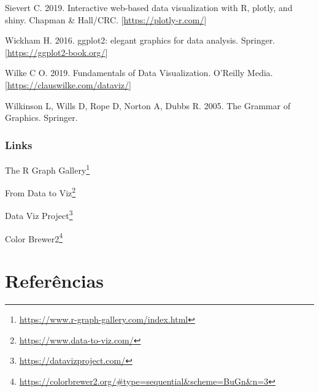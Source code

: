 \documentclass[
]{book}
\renewcommand{\href}[2]{#2\footnote{\url{#1}}}
\begin{document}
Sievert C. 2019. Interactive web-based data visualization with R, plotly, and shiny. Chapman \& Hall/CRC. {[}\url{https://plotly-r.com/}{]}

Wickham H. 2016. ggplot2: elegant graphics for data analysis. Springer. {[}\url{https://ggplot2-book.org/}{]}

Wilke C O. 2019. Fundamentals of Data Visualization. O'Reilly Media. {[}\url{https://clauswilke.com/dataviz/}{]}

Wilkinson L, Wills D, Rope D, Norton A, Dubbs R. 2005. The Grammar of Graphics. Springer.

\hypertarget{links-1}{%
\subsection{Links}\label{links-1}}

\href{https://www.r-graph-gallery.com/index.html}{The R Graph Gallery}

\href{https://www.data-to-viz.com/}{From Data to Viz}

\href{https://datavizproject.com/}{Data Viz Project}

\href{https://colorbrewer2.org/\#type=sequential\&scheme=BuGn\&n=3}{Color Brewer2}

\hypertarget{referuxeancias-1}{%
\chapter*{Referências}\label{referuxeancias-1}}


  

\printindex
\end{document}
